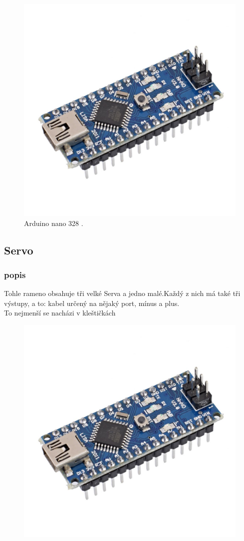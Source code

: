 \documentclass[12pt, a4paper,
twoside,        %
openright
]{report}
\begin{document}
{	\begin{figure}[h]
	
	\centering
	\includegraphics[width=0.6\linewidth]{image/arduino.jpg} 
	
	\caption{Arduino nano 328 \cite{Arduino}.} %
	\label{fig:Arduino} %
\end{figure}

\newpage 

\subsection{Servo }
\subsubsection{popis}
	Tohle rameno obsahuje tři velké Serva a jedno malé.Každý
	z nich má také tři výstupy, a to: kabel určený na nějaký port, mínus a plus. 
	\\
	To nejmenší se nacházi v kleštičkách 
\begin{figure}[h]
	
	\centering
	\includegraphics[width=0.4\linewidth]{image/arduino.jpg} 
	

\end{figure}}
\end{document}
